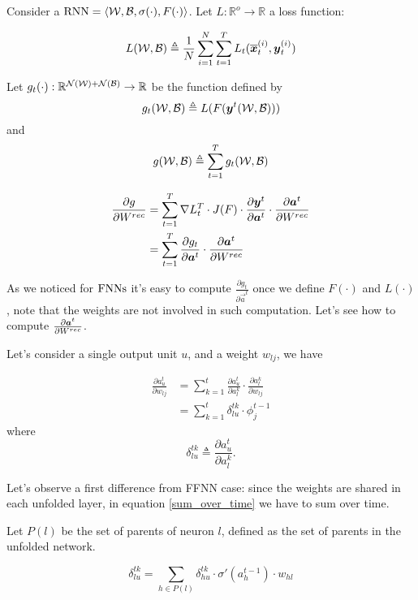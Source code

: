 Consider a $\mathrm{RNN}=\langle\mathcal{W},\mathcal{B},\sigma(\cdot),F(\cdot)\rangle$. Let $L:\mathbb{R}^o \rightarrow \mathbb{R}$ a loss function:

$$L(\mathcal{W},\mathcal{B})\triangleq\frac{1}{N}\sum_{i=1}^N \sum_{t=1}^T L_t(\overline{\boldsymbol{x}}_t^{(i)},\boldsymbol{y}_t^{(i)}) $$

Let $g_t(\cdot):\mathbb{R}^{\mathcal{N}(\mathcal{W})+\mathcal{N}(\mathcal{B})} \rightarrow \mathbb{R}$ be the function defined by
$$g_t(\mathcal{W},\mathcal{B}) \triangleq L(F(\boldsymbol{y}^t(\mathcal{W},\mathcal{B})))$$
and $$g(\mathcal{W},\mathcal{B}) \triangleq \sum_{t=1}^T g_t(\mathcal{W},\mathcal{B})$$


\begin{align}
\frac{\partial g}{\partial W^{rec}} &= \sum_{t=1}^T \nabla L_t^T \cdot J(F) \cdot \frac{\partial \boldsymbol{y}^t}{\partial \boldsymbol{a}^t} \cdot \frac{\partial \boldsymbol{a}^t}{\partial W^{rec}}\\
&= \sum_{t=1}^T\frac{\partial g_t}{\partial \boldsymbol{a}^t} \cdot \frac{\partial \boldsymbol{a}^t}{\partial W^{rec}}
\end{align}

As we noticed for $\mathrm{FNNs}$ it's easy to compute $\frac{\partial g_t}{\partial \vec{a}^t}$ once we define $F(\cdot)$ and $L(\cdot)$, note that the weights are not involved in such computation.
Let's see how to compute $\frac{\partial \boldsymbol{a}^t}{\partial W^{rec}}$.

Let's consider a single output unit $u$, and a weight $w_{lj}$, we have

\begin{align}
 \label{sum_over_time}
 \frac{\partial a^t_u}{\partial w_{lj}} &= \sum_{k=1}^t \frac{\partial a_u^t}{\partial a^k_l} \cdot \frac{\partial a^k_l}{\partial w_{lj}}\\
 &= \sum_{k=1}^t \delta^{tk}_{lu} \cdot \phi_j^{t-1}
\end{align}
where
\begin{equation}
\delta_{lu}^{tk} \triangleq \frac{\partial a_u^t}{\partial a^k_l}.
\end{equation}

Let's observe a first difference from FFNN case: since the weights are shared in each unfolded layer, in equation \ref{sum_over_time} we have to sum over time.

Let $P(l)$ be the set of parents of neuron $l$, defined as the set of parents in the unfolded network.

\begin{equation}
 \delta_{lu}^{tk} = \sum_{h\in P(l)} \delta_{hu}^{tk} \cdot \sigma'(a_h^{t-1})\cdot w_{hl}
\end{equation}

